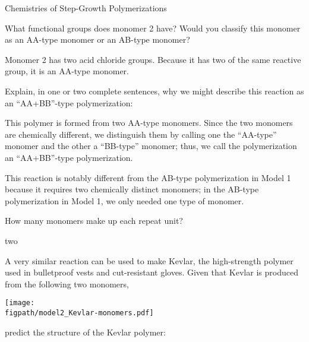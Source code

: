 \begin{activity}{Chemistries of Step-Growth Polymerizations}
\begin{ctqs}
		\question What functional groups does monomer 2 have?   Would you classify this monomer as an AA-type monomer or an AB-type monomer?
			
				\begin{solution}[0.75in]
					Monomer 2 has two acid chloride groups.  Because it has two of the same reactive group, it is an AA-type monomer.
				\end{solution}
		
		\question Explain, in one or two complete sentences, why we might describe this reaction as an ``AA+BB''-type polymerization:
			
				\begin{solution}[1.75in]
					This polymer is formed from two AA-type monomers.  Since the two monomers are chemically different, we distinguish them by calling one the ``AA-type'' monomer and the other a ``BB-type'' monomer; thus, we call the polymerization an ``AA+BB''-type polymerization.
					
					This reaction is notably different from the AB-type polymerization in Model 1 because it requires two chemically distinct monomers; in the AB-type polymerization in Model 1, we only needed one type of monomer.
				\end{solution}
		
		\question How many monomers make up each repeat unit?
			
				\begin{solution}[1in]
					two
				\end{solution}
		
		\question A very similar reaction can be used to make Kevlar, the high-strength polymer used in bulletproof vests and cut-resistant gloves.  Given that Kevlar is produced from the following two monomers,
		
	
	\centerline{\texttt{[image: \\figpath/model2\_Kevlar-monomers.pdf]}}
		
		predict the structure of the Kevlar polymer:
			
				\begin{solution}[2.5in]
				\end{solution}
		

\end{ctqs}
\end{activity}
